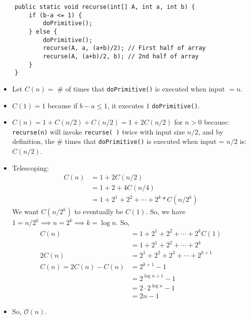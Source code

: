 \documentclass[12pt, a4paper]{article}
\def\O{\mathcal{O}}
\begin{document}
\begin{lstlisting}
	public static void recurse(int[] A, int a, int b) {
		if (b-a <= 1) {
			doPrimitive();
		} else {
			doPrimitive();
			recurse(A, a, (a+b)/2); // First half of array
			recurse(A, (a+b)/2, b); // 2nd half of array
		}
	}
\end{lstlisting}
\begin{itemize}
	\item Let $C(n)=$ \# of times that \texttt{doPrimitive()} is executed when input $=n$.
	\item $C(1)=1$ because if $b-a\leq1$, it executes $1$ \texttt{doPrimitive()}.
	\item  $C(n) = 1 + C(n/2) + C(n/2)=1+2C(n/2)$ for $n > 0$ because: \texttt{recurse(n)} will invoke \texttt{recurse( )} twice with input size $n/2$, and by definition, the \# times that \texttt{doPrimitive()} is executed when input = $n/2$ is: $C(n/2)$.
	\item Telescoping: \begin{align*}
		C(n)&=1+2C(n/2)\\
		&=1+2+4C(n/4)\\
		&=1+2^1+2^2+\cdots+2^k*C(n/2^k)
	\end{align*}
     We want $C(n/2^k)$ to eventually be $C(1)$. So, we have $1=n/2^k\implies n=2^k\implies k=\log{n}$.
     So, \begin{align*}
		C(n)&=1+2^1+2^2+\cdots+2^kC(1)\\
		&=1+2^1+2^2+\cdots+2^k\\
		2C(n)&=2^1+2^2+2^3+\cdots+2^{k+1}\\
		C(n)=2C(n)-C(n)&=2^{k+1}-1\\
		&=2^{\log{n}+1}-1\\&=2\cdot2^{\log{n}}-1\\
		&=2n-1
	\end{align*}
	\item So, $\O(n)$.
\end{itemize}
\end{document}
